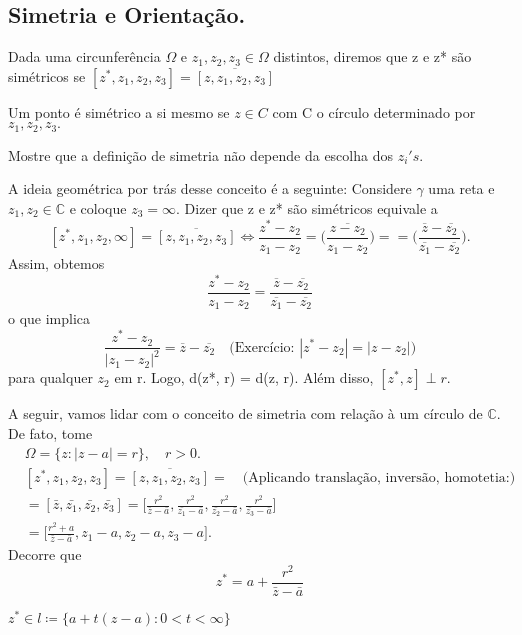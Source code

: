 \documentclass[complex.tex]{subfiles}
\begin{document}
\subsection{Simetria e Orientação.}
Dada uma circunferência $\Omega\text{ e }z_1, z_2, z_3\in \Omega$ distintos, diremos que z e z* são simétricos se
$[z^*, z_1, z_2, z_3] = \overline{[z, z_1, z_2, z_3]}$
\begin{example}
	Um ponto é simétrico a si mesmo se $z\in{C}$ com C o círculo determinado por $z_1, z_2, z_3.$
\end{example}
\begin{exer*}
	Mostre que a definição de simetria não depende da escolha dos $z_{i}'s.$
\end{exer*}
A ideia geométrica por trás desse conceito é a seguinte: Considere $\gamma$ uma reta e $z_1, z_2\in \mathbb{C}$
e coloque $z_3 = \infty.$ Dizer que z e z* são simétricos equivale a
$$
	[z^*, z_1, z_2, \infty] = \overline{[z, z_1, z_2, z_3]}\Longleftrightarrow \frac{z^* - z_2}{z_1 - z_2} = \overline{\biggl(\frac{z - z_2}{z_1 - z_2}\biggr)} =
	= \biggl(\frac{\overline{z} - \overline{z_2}}{\overline{z_1} - \overline{z_2}}\biggr).
$$
Assim, obtemos
$$
	\frac{z^* - z_2}{z_1 - z_2} = \frac{\overline{z} - \overline{z_2}}{\overline{z_1} - \overline{z_2}}
$$
o que implica
$$
	\frac{z^* - z_2}{|z_1 - z_2|^2} = \overline{z} - \overline{z_2} \quad \text{(Exercício: } |z^* - z_2| = |z - z_2|)
$$
para qualquer $z_2$ em r. Logo, d(z*, r) = d(z, r). Além disso, $[z^*, z]\perp{r}.$

A seguir, vamos lidar com o conceito de simetria com relação à um círculo de $\mathbb{C}.$ De fato, tome
\begin{align*}
	 & \Omega = \{z: |z - a| = r\}, \quad r > 0.                                                                                                                                                     \\
	 & [z^*, z_1, z_2, z_3] = \overline{[z, z_1, z_2, z_3]} = \quad \text{(Aplicando translação, inversão, homotetia:)}                                                                              \\
	 & = [\bar{z}, \bar{z_1}, \bar{z_2}, \bar{z_3}] = \biggl[\frac{r^2}{\bar{z} - \bar{a}}, \frac{r^2}{\bar{z_1} - \bar{a}}, \frac{r^2}{\bar{z_2} - \bar{a}}, \frac{r^2}{\bar{z_3} - \bar{a}}\biggr] \\
	 & = \biggl[\frac{r^2 + a}{\bar{z} - \bar{a}}, z_1 - a, z_2 - a, z_3 - a\biggr].
\end{align*}
Decorre que
$$
	z^* = a + \frac{r^2}{\bar{z} - \bar{a}}
$$
\begin{exer*}
	$z^*\in{l}\coloneqq  \{a + t(z-a): 0 < t < \infty\} $
\end{exer*}
\end{document}
